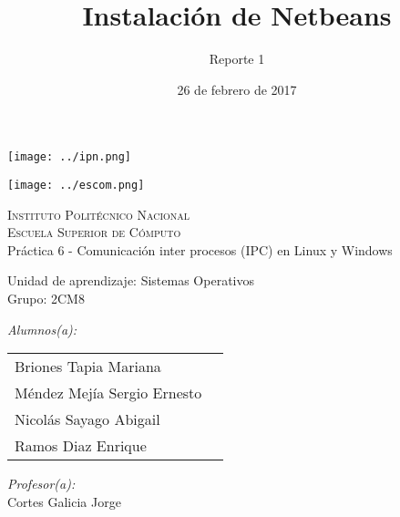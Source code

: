\documentclass[12pt]{article}
\date{26 de febrero de 2017}
\title{Instalación de Netbeans}
\author{Reporte 1}
\begin{document}
		\begin{titlepage}
			\begin{center}
				
				
				\noindent
				\begin{minipage}{0.5\textwidth}
					\begin{flushleft} \large
						\texttt{[image: ../ipn.png]}
					\end{flushleft}
				\end{minipage}%
				\begin{minipage}{0.55\textwidth}
					\begin{flushright} \large
						\texttt{[image: ../escom.png]}
					\end{flushright}
				\end{minipage}
				
				\textsc{\LARGE Instituto Politécnico Nacional}\\[0.5cm]
				
				\textsc{\Large Escuela Superior de Cómputo}\\[1cm]
				
				
				{ \huge Práctica 6 - Comunicación inter procesos (IPC) en Linux y Windows \\[1cm] }
				
				{ \Large Unidad de aprendizaje: Sistemas Operativos} \\[1cm]
				
				{ \Large Grupo: 2CM8 } \\[1cm]
				
				\noindent
				\begin{minipage}{0.5\textwidth}
					\begin{flushleft} \large
						\emph{Alumnos(a):}\\
						
						\begin{tabular}{ll}
						 Briones Tapia Mariana \\
						 Méndez Mejía Sergio Ernesto \\
					   Nicolás Sayago Abigail\\
					   Ramos Diaz Enrique \\
					     
					\end{tabular}
					\end{flushleft}
				\end{minipage}%
				\begin{minipage}{0.5\textwidth}
					\begin{flushright} \large
						\emph{Profesor(a):} \\
						Cortes Galicia Jorge  \\
					\end{flushright}
				\end{minipage}
				

\end{center}
\end{titlepage}
\end{document}
